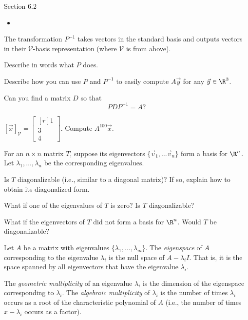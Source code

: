 \documentclass{problemset}
\newcommand{\mat}[1]{\begin{bmatrix*}[r]#1\end{bmatrix*}}
\begin{document}
\begin{lesson}
	\newpage

	Section 6.2

	\begin{itemize}
		\item 
	\end{itemize}


	\newpage
\end{lesson}
	\question
	The transformation $P^{-1}$ takes vectors in the standard basis and outputs
	vectors in their $\mathcal V$-basis representation (where $\mathcal V$ is from above).  
	\begin{parts}
		\item Describe in words what $P$ does.
		\item Describe how you can use $P$ and $P^{-1}$ to easily compute
			$A\vec y$ for any $\vec y\in \R^3$.
		\item Can you find a matrix $D$ so that
			\[
				PDP^{-1}=A?
			\]
		\item $[\vec x]_{\mathcal V}=\mat{1\\3\\4}$.  Compute $A^{100}\vec x$.
	\end{parts}


	\question
	For an $n\times n$ matrix $T$, suppose its eigenvectors $\{\vec v_1,\ldots \vec v_n\}$
	form a basis for $\R^n$.  Let $\lambda_1,\ldots,\lambda_n$ be the corresponding
	eigenvalues.
	

	\begin{parts}
	\item Is $T$ diagonalizable (i.e., similar to a diagonal matrix)?  If so, explain how to obtain its diagonalized form.
		\item What if one of the eigenvalues of $T$ is zero?  Is $T$ diagonalizable?
		\item What if the eigenvectors of $T$ did not form a basis for $\R^n$.
			Would $T$ be diagonalizable?
	\end{parts}

	\begin{definition}[Eigenspace]
	Let $A$ be a matrix with eigenvalues $\{\lambda_1,\ldots,\lambda_m\}$.  The
	\emph{eigenspace} of $A$ corresponding to the eigenvalue $\lambda_i$ is the
	null space of $A-\lambda_i I$.  That is, it is the space spanned by all eigenvectors
	that have the eigenvalue $\lambda_i$.

	The \emph{geometric multiplicity} of an eigenvalue $\lambda_i$ is the dimension
	of the eigenspace corresponding to $\lambda_i$.  The \emph{algebraic multiplicity}
	of $\lambda_i$ is the number of times $\lambda_i$ occurs as a root of the
	characteristic polynomial of $A$ (i.e., the number of times $x-\lambda_i$
	occurs as a factor).
	\end{definition}
\end{document}
